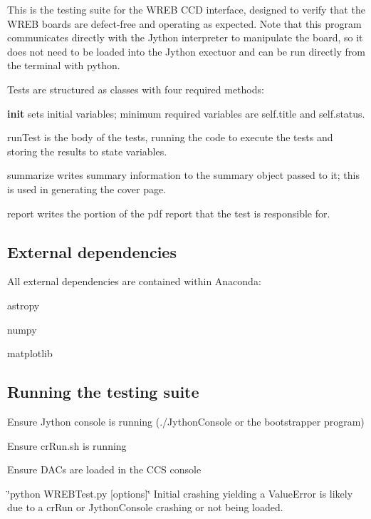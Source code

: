 This is the testing suite for the W\+R\+EB C\+CD interface, designed to verify that the W\+R\+EB boards are defect-\/free and operating as expected. Note that this program communicates directly with the Jython interpreter to manipulate the board, so it does not need to be loaded into the Jython exectuor and can be run directly from the terminal with python.

Tests are structured as classes with four required methods\+:
\begin{DoxyItemize}
\item {\bfseries init} sets initial variables; minimum required variables are self.\+title and self.\+status.
\item run\+Test is the body of the tests, running the code to execute the tests and storing the results to state variables.
\item summarize writes summary information to the summary object passed to it; this is used in generating the cover page.
\item report writes the portion of the pdf report that the test is responsible for.
\end{DoxyItemize}

\subsection*{External dependencies}

All external dependencies are contained within Anaconda\+:
\begin{DoxyItemize}
\item astropy
\item numpy
\item matplotlib
\end{DoxyItemize}

\subsection*{Running the testing suite}


\begin{DoxyItemize}
\item Ensure Jython console is running (./\+Jython\+Console or the bootstrapper program)
\item Ensure cr\+Run.\+sh is running
\item Ensure D\+A\+Cs are loaded in the C\+CS console
\item \char`\"{}python W\+R\+E\+B\+Test.\+py \mbox{[}options\mbox{]}\char`\"{} Initial crashing yielding a Value\+Error is likely due to a cr\+Run or Jython\+Console crashing or not being loaded. 
\end{DoxyItemize}